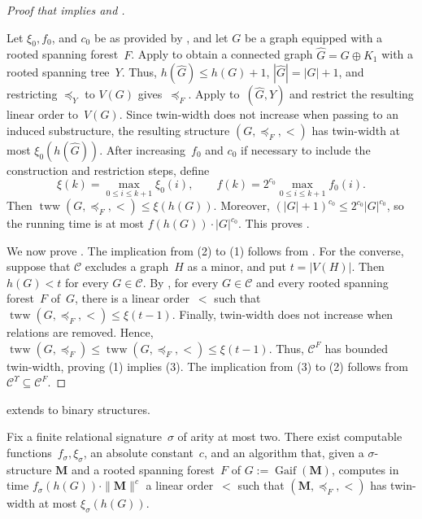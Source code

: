 \documentclass[1p,number,11pt]{elsarticle}
\newcommand{\Gaif}{\operatorname{Gaif}}
\theoremstyle{plain}
\newcommand{\Cc}{\mathscr{C}}
\renewcommand{\leq}{\leqslant}
\begin{document}
\begin{proof}[Proof that {} implies
{} and {}]
\label{pf:th1}

Let $\xi_0,f_0$, and $c_0$ be as provided by , and let $G$ be a graph equipped with a rooted spanning forest~$F$.
Apply  to obtain a connected graph $\widehat G=G\oplus K_1$ with a rooted spanning tree~$Y$.
Thus, $h(\widehat G)\leq h(G)+1$, $|\widehat G|=|G|+1$, and restricting $\preceq_Y$ to $V(G)$ gives~$\preceq_F$.
Apply  to~$(\widehat G,Y)$ and restrict the resulting linear order to~$V(G)$.
Since twin-width does not increase when passing to an induced substructure, the resulting structure $(G,\preceq_F,<)$ has twin-width at most $\xi_0(h(\widehat G))$.
After increasing~$f_0$ and $c_0$ if necessary to include the construction and restriction steps, define
\[
 \xi(k)=\max_{0\leq i\leq k+1}\xi_0(i),
 \qquad
 f(k)=2^{c_0}\max_{0\leq i\leq k+1}f_0(i).
\]
Then $\operatorname{tww}(G,\preceq_F,<)\leq\xi(h(G))$.
Moreover, $(|G|+1)^{c_0}\leq2^{c_0}|G|^{c_0}$, so the running time is at most $f(h(G))\cdot|G|^{c_0}$.
This proves .

We now prove .
The implication from (2) to (1) follows from
.
%
For the converse, suppose that $\Cc$ excludes a graph~$H$ as a minor,
and put $t=|V(H)|$.
Then $h(G)<t$ for every $G\in\Cc$. 
By , for every $G\in\Cc$ and every rooted spanning
forest~$F$ of~$G$, there is a linear order~$<$ such that
$\operatorname{tww}(G,\preceq_F,<)\leq \xi(t-1)$.
Finally, twin-width does not increase when relations are removed.
Hence, $\operatorname{tww}(G,\preceq_F)
 \leq \operatorname{tww}(G,\preceq_F,<)
 \leq \xi(t-1)$.
Thus, $\Cc^F$ has bounded twin-width, proving (1) implies (3).
%
The implication from (3) to (2) follows from $\Cc^{\Upsilon}\subseteq\Cc^F$.
\end{proof}

 extends to binary structures.

\begin{theorem}[store=thm-main-algo-structures]
Fix a finite relational signature~$\sigma$ of arity at most two.
There exist computable functions~$f_\sigma,\xi_\sigma$, an absolute
constant~$c$, and an algorithm that, given a $\sigma$-structure
$\mathbf M$ and a rooted spanning forest~$F$ of
$G:=\Gaif(\mathbf M)$, computes in time
$f_\sigma(h(G))\cdot\|\mathbf M\|^c$ a linear order~$<$ such that
$(\mathbf M,\preceq_F,<)$ has twin-width at most
$\xi_\sigma(h(G))$.
\end{theorem}
\end{document}
